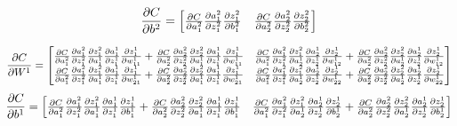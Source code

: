 \documentclass{article}
\begin{document}
\[
\frac{\partial C} {\partial b^2} =  \scalebox{1.}{$ \begin{bmatrix}
		\frac{\partial C}{\partial a^2_1} \frac{\partial  a^2_1}{\partial z^2_1} \frac{\partial z^2_1 }{\partial b^2_{1}} &
		\frac{\partial C}{\partial a^2_2} \frac{\partial  a^2_2}{\partial z^2_2} \frac{\partial z^2_2}{\partial b^2_{2}} 
	\end{bmatrix}$}
\]

\[
\frac{\partial C} {\partial W^1} =  \scalebox{1}{$ \begin{bmatrix}
		\frac{\partial C}{\partial a^2_1} \frac{\partial  a^2_1}{\partial z^2_1} \frac{\partial z^2_1 }{\partial a^1_{1}} \frac{\partial a^1_1}{\partial z^1_1} \frac{\partial z^1_1 }{\partial w^1_{11}} +  \frac{\partial C}{\partial a^2_2} \frac{\partial  a^2_2}{\partial z^2_2} \frac{\partial z^2_2 }{\partial a^1_{1}} \frac{\partial a^1_1}{\partial z^1_1} \frac{\partial z^1_1 }{\partial w^1_{11}}
		&
		\frac{\partial C}{\partial a^2_1} \frac{\partial  a^2_1}{\partial z^2_1} \frac{\partial z^2_1 }{\partial a^1_{2}} \frac{\partial a^1_2}{\partial z^1_2} \frac{\partial z^1_2 }{\partial w^1_{12}} +  \frac{\partial C}{\partial a^2_2} \frac{\partial  a^2_2}{\partial z^2_2} \frac{\partial z^2_2 }{\partial a^1_{2}} \frac{\partial a^1_2}{\partial z^1_2} \frac{\partial z^1_2 }{\partial w^1_{12}}
		\\
		\frac{\partial C}{\partial a^2_1} \frac{\partial  a^2_1}{\partial z^2_1} \frac{\partial z^2_1 }{\partial a^1_{1}} \frac{\partial a^1_1}{\partial z^1_1} \frac{\partial z^1_1 }{\partial w^1_{21}} +  \frac{\partial C}{\partial a^2_2} \frac{\partial  a^2_2}{\partial z^2_2} \frac{\partial z^2_2 }{\partial a^1_{1}} \frac{\partial a^1_1}{\partial z^1_1} \frac{\partial z^1_1 }{\partial w^1_{21}}
		& 
		\frac{\partial C}{\partial a^2_1} \frac{\partial  a^2_1}{\partial z^2_1} \frac{\partial z^2_1 }{\partial a^1_{2}} \frac{\partial a^1_2}{\partial z^1_2} \frac{\partial z^1_2 }{\partial w^1_{22}} +  \frac{\partial C}{\partial a^2_2} \frac{\partial  a^2_2}{\partial z^2_2} \frac{\partial z^2_2 }{\partial a^1_{2}} \frac{\partial a^1_2}{\partial z^1_2} \frac{\partial z^1_2 }{\partial w^1_{22}}
	\end{bmatrix}$}
\]
\[
\frac{\partial C} {\partial b^1} =  \scalebox{1}{$ \begin{bmatrix}
		\frac{\partial C}{\partial a^2_1} \frac{\partial  a^2_1}{\partial z^2_1} \frac{\partial z^2_1 }{\partial a^1_{1}} \frac{\partial a^1_1}{\partial z^1_1} \frac{\partial z^1_1 }{\partial b^1_{1}} + \frac{\partial C}{\partial a^2_2} \frac{\partial  a^2_2}{\partial z^2_2} \frac{\partial z^2_2 }{\partial a^1_{1}} \frac{\partial a^1_1}{\partial z^1_1} \frac{\partial z^1_1 }{\partial b^1_{1}}
		&
		\frac{\partial C}{\partial a^2_1} \frac{\partial  a^2_1}{\partial z^2_1} \frac{\partial z^2_1 }{\partial a^1_{2}} \frac{\partial a^1_2}{\partial z^1_2} \frac{\partial z^1_2 }{\partial b^1_{2}} +  \frac{\partial C}{\partial a^2_2} \frac{\partial  a^2_2}{\partial z^2_2} \frac{\partial z^2_2 }{\partial a^1_{2}} \frac{\partial a^1_2}{\partial z^1_2} \frac{\partial z^1_2 }{\partial b^1_{2}}

	\end{bmatrix}$}
\]
\end{document}
